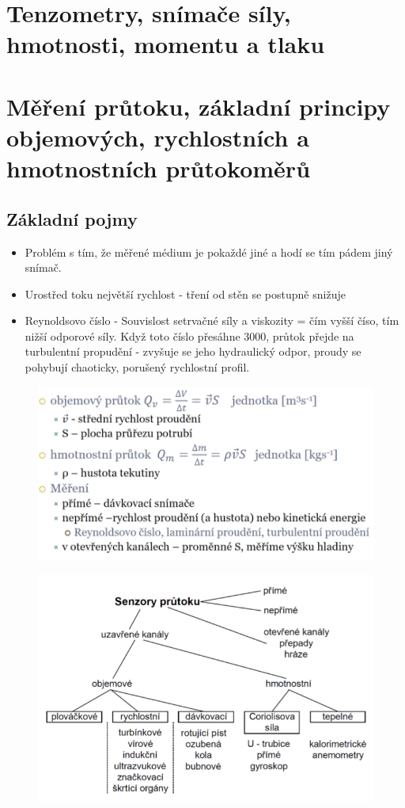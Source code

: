 \section{Tenzometry, snímače síly, hmotnosti, momentu a tlaku }


\section{Měření průtoku, základní principy objemových, rychlostních a hmotnostních průtokoměrů}
\subsection*{Základní pojmy}
\begin{itemize}
    \item Problém s tím, že měřené médium je pokaždé jiné a hodí se tím pádem jiný snímač.
    \item Urostřed toku největší rychlost - tření od stěn se postupně snižuje
    \item Reynoldsovo číslo - Souvislost setrvačné síly a viskozity = čím vyšší číso, tím nižší odporové síly. Když toto číslo přesáhne 3000, průtok přejde na turbulentní propudění - zvyšuje se jeho hydraulický odpor, proudy se pohybují chaoticky, porušený rychlostní profil.
\end{itemize}
\begin{figure}[!h]
    \centering
    \includegraphics[scale = 0.8]{img/prutokZaklad.png}
\end{figure}

\begin{figure}[!h]
    \centering
    \includegraphics[scale = 1]{img/proudoverozdeleni.png}
\end{figure}

